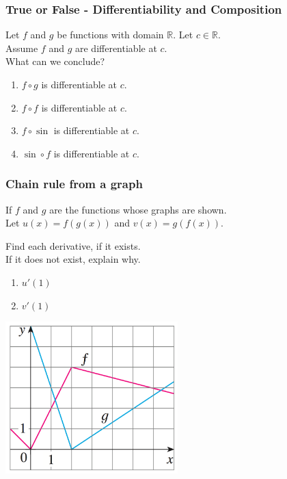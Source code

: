 \documentclass[14pt]{beamer}
\begin{document}
	\begin{frame}[t]
		\frametitle{True or False - Differentiability and Composition}

		Let $f$ and $g$ be functions with domain $\mathbb{R}$. Let $c \in \mathbb{R}$.
		\\ Assume $f$ and $g$ are differentiable at $c$. \\ What can we conclude?

		\vfill

		\begin{enumerate}
			\item $f \circ g$ \; is {\color{blue} differentiable} at $c$.
				\vfill

			\item $f \circ f$ \; is {\color{blue} differentiable} at $c$.
				\vfill

			\item $f \circ \sin$ \; is {\color{blue} differentiable} at $c$.
				\vfill

			\item $\sin \circ f$ \; is {\color{blue} differentiable} at $c$.
				\vfill
		\end{enumerate}
	\end{frame}

	\begin{frame}
		\frametitle{Chain rule from a graph}

		If $f$ and $g$ are the functions whose graphs are shown. \\ Let $u(x)=f(g(x))$
		and $v(x)=g(f(x))$. \\
		\medskip

		Find each derivative, if it exists. \\ If it does not exist, explain why.

		\begin{enumerate}
			\item $u'(1)$

			\item $v'(1)$
		\end{enumerate}
		\vspace{-1cm}

		\begin{center}
			\includegraphics[width=0.5\textwidth]{G10}
		\end{center}
	\end{frame}
\end{document}
